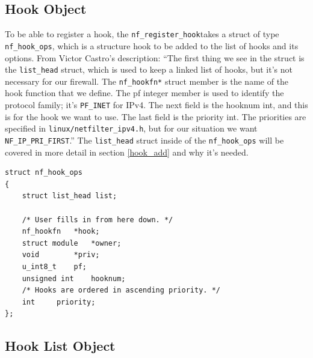 
\subsection{Hook Object}\label{hook_object}
To be able to register a hook, the \verb|nf_register_hook|takes a struct of type \verb|nf_hook_ops|, which is a structure hook to be added to the list of hooks and its options.
From Victor Castro's description: ``The first thing we see in the struct is the \verb|list_head| struct, which is used to keep a linked list of hooks, but it's not necessary for our firewall. The \verb|nf_hookfn*| struct member is the name of the hook function that we define. The pf integer member is used to identify the protocol family; it's \verb|PF_INET| for IPv4. The next field is the hooknum int, and this is for the hook we want to use. The last field is the priority int. The priorities are specified in \verb|linux/netfilter_ipv4.h|, but for our situation we want \verb|NF_IP_PRI_FIRST|.''\cite{netfilter-firewall}
The \verb|list_head| struct inside of the \verb|nf_hook_ops| will be covered in more detail in section \ref{hook_add} and why it's needed.
\cite{netfilter-firewall}

\begin{lstlisting}
struct nf_hook_ops
{
	struct list_head list;

	/* User fills in from here down. */
	nf_hookfn	*hook;
	struct module	*owner;
	void		*priv;
	u_int8_t	pf;
	unsigned int	hooknum;
	/* Hooks are ordered in ascending priority. */
	int		priority;
};
\end{lstlisting}

\subsection{Hook List Object}\label{hook_list_object}


